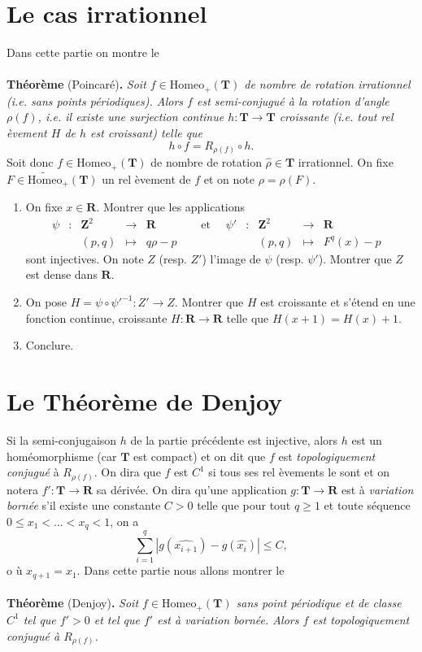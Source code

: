 \documentclass[a4paper,12pt]{article}
\theoremstyle{plain}
\theoremstyle{definition}
\newcommand{\T}{\mathbf{T}}
\newcommand{\R}{\mathbf{R}}
\newcommand{\Z}{\mathbf{Z}}
\newcommand{\Homeo}{\mathrm{Homeo}}
\begin{document}
{%
\section*{Le cas irrationnel}
Dans cette partie on montre le \\ \\
\textbf{Th\'eor\`eme} (Poincar\'e)\textbf{.} \textit{ Soit $f \in \Homeo_+(\T)$ de nombre de rotation irrationnel (i.e. sans points p\'eriodiques). Alors $f$ est semi-conjugu\'e  \`a la rotation d'angle $\rho(f)$, i.e. il existe une surjection continue $h : \T \to \T$ croissante (i.e. tout rel \`evement $H$ de $h$ est croissant) telle que 
$$
h \circ f = R_{\rho(f)} \circ h.
$$} Soit donc $f \in \Homeo_+(\T)$ de nombre de rotation $\hat{\rho} \in \T$ irrationnel. On fixe $F \in \widetilde{\Homeo}_+(\T)$ un rel \`evement de $f$ et on note $\rho = \rho(F)$. 
\begin{enumerate}[resume, label=\textbf{\arabic*.}]
\item On fixe $x \in \R$. Montrer que les applications
$$
\begin{matrix}
\psi & : & \Z^2 & \to&  \R & \quad \text{ et }\quad \psi' & : & \Z^2 & \to&  \R \\
& & (p,q) & \mapsto & q\rho - p & & & (p,q) & \mapsto & F^q(x)-p &
\end{matrix} 
$$
sont injectives. On note $Z$ (resp. $Z'$) l'image de $\psi$ (resp. $\psi'$). Montrer que $Z$ est dense dans $\R$. 
\item On pose $H = \psi \circ \psi'^{-1} : Z' \to Z$. Montrer que $H$ est croissante et s'\'etend en une fonction continue, croissante $H : \R \to \R$ telle que $H(x+1) = H(x) + 1$. 
\item Conclure.
\end{enumerate}

\section*{Le Th\'eor\`eme de Denjoy}
Si la semi-conjugaison $h$ de la partie pr\'ec\'edente est injective, alors $h$ est un hom\'eomorphisme (car $\T$ est compact) et on dit que $f$ est \textit{topologiquement conjugu\'e}  \`a $R_{\rho(f)}$. On dira que $f$ est $C^1$ si tous ses rel \`evements le sont et on notera $f' : \T \to \R$ sa d\'eriv\'ee. On dira qu'une application $g : \T \to \R$ est  \`a \textit{variation born\'ee} s'il existe une constante $C > 0$ telle que pour tout $q \geq 1$ et toute s\'equence $0 \leq x_1< \dots < x_q < 1$, on a
$$
\sum_{i=1}^q |g(\widehat{x_{i+1}}) - g(\widehat{x_i})| \leq C,
$$
o \`u $x_{q+1} = x_1$.
Dans cette partie nous allons montrer le \\ \\
\textbf{Th\'eor\`eme} (Denjoy)\textbf{.} \textit{Soit $f \in \Homeo_+(\T)$ sans point p\'eriodique et de classe $C^1$ tel que $f' > 0$ et tel que $f'$ est  \`a variation born\'ee. Alors $f$ est topologiquement conjugu\'e  \`a $R_{\rho(f)}$.}\\

}
\end{document}
